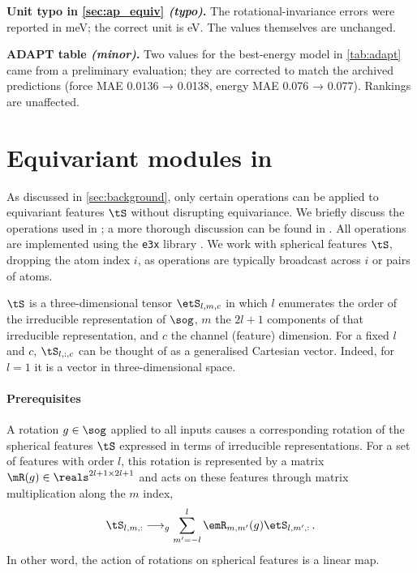 \documentclass[10pt]{article}
\begin{document}
\textbf{Unit typo in \cref{sec:ap_equiv} \emph{(typo)}.} The rotational-invariance errors were reported in meV; the correct unit is eV. The values themselves are unchanged.

\textbf{ADAPT table \emph{(minor)}.} Two values for the best-energy \lorem model in \cref{tab:adapt} came from a preliminary evaluation; they are corrected to match the archived predictions (force MAE 0.0136 → 0.0138, energy MAE 0.076 → 0.077). Rankings are unaffected.





\newpage
\appendix
{}


\section{Equivariant modules in \lorem}
\label{sec:apx-modules}

As discussed in \cref{sec:background}, only certain operations can be applied to equivariant features $\tS$ without disrupting equivariance. We briefly discuss the operations used in \lorem; a more thorough discussion can be found in \citet{s2021,um2024}. All operations are implemented using the \texttt{e3x} library \citep{um2024}.
We work with spherical features $\tS$, dropping the atom index $i$, as operations are typically broadcast across $i$ or pairs of atoms.

$\tS$ is a three-dimensional tensor $\etS_{l,m,c}$ in which $l$ enumerates the order of the irreducible representation of $\sog$, $m$ the $2l+1$ components of that irreducible representation, and $c$ the channel (feature) dimension. For a fixed $l$ and $c$, $\tS_{l,:,c}$ can be thought of as a generalised Cartesian vector. Indeed, for $l=1$ it is a vector in three-dimensional space.

\paragraph{Prerequisites} A rotation $g \in \sog$ applied to all inputs causes a corresponding rotation of the spherical features $\tS$ expressed in terms of irreducible representations. For a set of features with order $l$, this rotation is represented by a matrix $\mR(g) \in \reals^{2l+1 \times 2l+1}$ and acts on these features through matrix multiplication along the $m$ index,
\begin{equation}
    \tS_{l,m,:} \longrightarrow_{g} \sum_{m'=-l}^{l} \emR_{m,m'}(g) \etS_{l,m',:} \, .
\end{equation}
In other word, the action of rotations on spherical features is a linear map.
\end{document}
